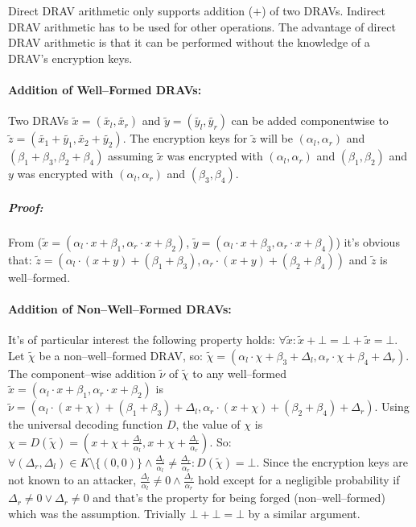 Direct DRAV arithmetic only supports addition ($+$) of two DRAVs. Indirect DRAV
arithmetic has to be used for other operations. The advantage of direct DRAV
arithmetic is that it can be performed without the knowledge of a DRAV's
encryption keys.

\paragraph{Addition of Well--Formed DRAVs:} Two DRAVs $\widetilde{x} =
(\widetilde{x_l}, \widetilde{x_r})$ and $\widetilde{y} = (\widetilde{y_l},
\widetilde{y_r})$ can be added componentwise to $\widetilde{z} =
\left(\widetilde{x_1} + \widetilde{y_1}, \widetilde{x_2} +
\widetilde{y_2}\right)$. The encryption keys for $\widetilde{z}$ will be
$(\alpha_l, \alpha_r)$ and $(\beta_1 + \beta_3, \beta_2 + \beta_4)$ assuming
$\widetilde{x}$ was encrypted with $(\alpha_l, \alpha_r)$ and $(\beta_1,
\beta_2)$ and $y$ was encrypted with $(\alpha_l, \alpha_r)$ and $(\beta_3,
\beta_4)$.

\subparagraph{Proof:} From ($\widetilde{x} = \left(\alpha_l \cdot x + \beta_1,
\alpha_r \cdot x + \beta_2\right)$, $\widetilde{y} = \left(\alpha_l \cdot x +
\beta_3, \alpha_r \cdot x + \beta_4\right)$) it's obvious that: $\widetilde{z} =
\left(\alpha_l \cdot (x+y) + (\beta_1 + \beta_3), \alpha_r \cdot (x+y) +
(\beta_2 + \beta_4)\right)$ and $\widetilde{z}$ is well--formed.

\paragraph{Addition of Non--Well--Formed DRAVs:} It's of particular interest the
following property holds: $\forall \widetilde{x}: \widetilde{x} + \bot = \bot
+ \widetilde{x} = \bot$. Let $\widetilde{\chi}$ be a non--well--formed DRAV,
so: $\widetilde{\chi} = (\alpha_l \cdot \chi + \beta_3 + \Delta_l, \alpha_r
\cdot \chi + \beta_4 + \Delta_r)$. The component--wise addition
$\widetilde{\nu}$ of $\widetilde{\chi}$ to any well--formed $\widetilde{x} =
(\alpha_l \cdot x + \beta_1, \alpha_r \cdot x + \beta_2)$ is $\widetilde{\nu} =
(\alpha_l \cdot (x+\chi) + (\beta_1+\beta_3) + \Delta_l, \alpha_r \cdot (x+\chi)
+ (\beta_2+\beta_4) + \Delta_r)$. Using the universal decoding function $D$, the
value of $\chi$ is $\chi = D(\widetilde{\chi}) = (x + \chi +
\frac{\Delta_l}{\alpha_l}, x + \chi + \frac{\Delta_r}{\alpha_r})$. So: $\forall
(\Delta_r, \Delta_l) \in K \setminus \{(0, 0)\} \wedge \frac{\Delta_l}{\alpha_l}
\neq \frac{\Delta_r}{\alpha_r}: D(\widetilde{\chi}) = \bot$. Since the
encryption keys are not known to an attacker, $\frac{\Delta_l}{\alpha_l} \neq 0
\wedge \frac{\Delta_r}{\alpha_r}$ hold except for a negligible probability if
$\Delta_r \neq 0 \vee \Delta_r \neq 0$ and that's the property for being forged
(non--well--formed) which was the assumption. Trivially $\bot + \bot = \bot$ by
a similar argument.


